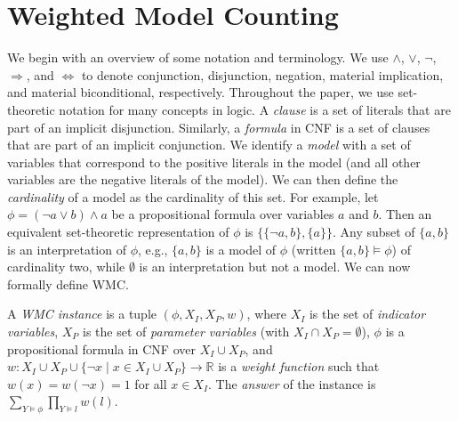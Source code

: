 

\section{Weighted Model Counting}

We begin with an overview of some notation and terminology. We use $\land$,
$\lor$, $\neg$, $\Rightarrow$, and $\Leftrightarrow$ to denote conjunction,
disjunction, negation, material implication, and material biconditional,
respectively. Throughout the paper, we use set-theoretic notation for many
concepts in logic. A \emph{clause} is a set of literals that are part of an
implicit disjunction. Similarly, a \emph{formula} in CNF is a set of clauses
that are part of an implicit conjunction. We identify a \emph{model} with a set
of variables that correspond to the positive literals in the model (and all
other variables are the negative literals of the model). We can then define the
\emph{cardinality} of a model as the cardinality of this set. For example, let
$\phi = (\neg a \lor b) \land a$ be a propositional formula over variables $a$
and $b$. Then an equivalent set-theoretic representation of $\phi$ is $\{ \{
\neg a, b \}, \{ a \} \}$. Any subset of $\{ a, b \}$ is an interpretation of
$\phi$, e.g., $\{ a, b \}$ is a model of $\phi$ (written $\{ a, b \} \models
\phi$) of cardinality two, while $\emptyset$ is an interpretation but not a
model. We can now formally define WMC.

\begin{definition}[WMC] \label{def:wmc}
  A \emph{WMC instance} is a tuple $(\phi, X_I, X_P, w)$, where $X_I$ is
  the set of \emph{indicator variables}, $X_P$ is the set of \emph{parameter
  variables} (with $X_I \cap X_P = \emptyset$), $\phi$ is a propositional formula
  in CNF over $X_I \cup X_P$, and $w\colon X_I \cup X_P \cup \{\neg x \mid x \in
  X_I \cup X_P\} \to \mathbb{R}$ is a \emph{weight function} such that $w(x) =
  w(\neg x) = 1$ for all $x \in X_I$. The \emph{answer} of the instance is
  $\sum_{Y \models \phi} \prod_{Y \models l} w(l)$.
\end{definition}

